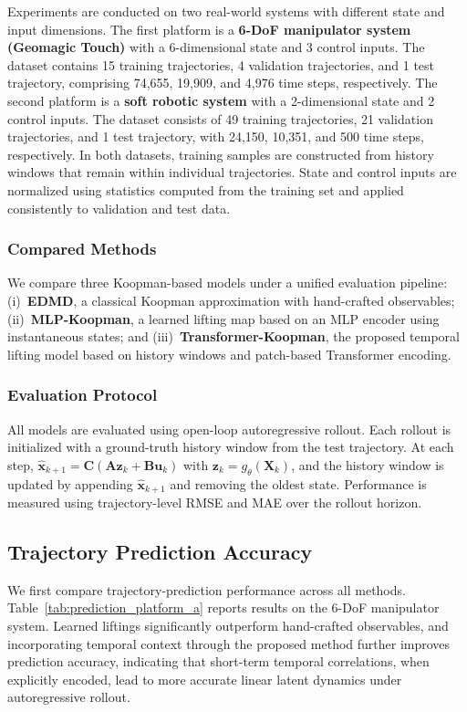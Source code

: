 \documentclass[journal]{IEEEtran}
\newcommand{\vx}{\mathbf{x}}
\newcommand{\vu}{\mathbf{u}}
\newcommand{\vz}{\mathbf{z}}
\newcommand{\mA}{\mathbf{A}}
\newcommand{\mB}{\mathbf{B}}
\newcommand{\mC}{\mathbf{C}}
\newcommand{\mX}{\mathbf{X}}
\begin{document}
Experiments are conducted on two real-world systems with different state and input dimensions. The first platform is a \textbf{6-DoF manipulator system (Geomagic Touch)} with a 6-dimensional state and 3 control inputs. The dataset contains 15 training trajectories, 4 validation trajectories, and 1 test trajectory, comprising 74,655, 19,909, and 4,976 time steps, respectively. The second platform is a \textbf{soft robotic system} with a 2-dimensional state and 2 control inputs. The dataset consists of 49 training trajectories, 21 validation trajectories, and 1 test trajectory, with 24,150, 10,351, and 500 time steps, respectively. In both datasets, training samples are constructed from history windows that remain within individual trajectories. State and control inputs are normalized using statistics computed from the training set and applied consistently to validation and test data.

\subsubsection{Compared Methods}

We compare three Koopman-based models under a unified evaluation pipeline: (i)~\textbf{EDMD}, a classical Koopman approximation with hand-crafted observables; (ii)~\textbf{MLP-Koopman}, a learned lifting map based on an MLP encoder using instantaneous states; and (iii)~\textbf{Transformer-Koopman}, the proposed temporal lifting model based on history windows and patch-based Transformer encoding.

\subsubsection{Evaluation Protocol}
\label{sec:eval_protocol}

All models are evaluated using open-loop autoregressive rollout. Each rollout is initialized with a ground-truth history window from the test trajectory. At each step, $\hat{\vx}_{k+1} = \mC(\mA \vz_k + \mB \vu_k)$ with $\vz_k = g_\theta(\mX_k)$, and the history window is updated by appending $\hat{\vx}_{k+1}$ and removing the oldest state. Performance is measured using trajectory-level RMSE and MAE over the rollout horizon.

\subsection{Trajectory Prediction Accuracy}

We first compare trajectory-prediction performance across all methods. Table~\ref{tab:prediction_platform_a} reports results on the 6-DoF manipulator system. Learned liftings significantly outperform hand-crafted observables, and incorporating temporal context through the proposed method further improves prediction accuracy, indicating that short-term temporal correlations, when explicitly encoded, lead to more accurate linear latent dynamics under autoregressive rollout.
\end{document}
